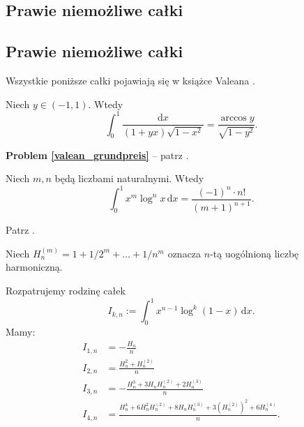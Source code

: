 \subsection{Prawie niemożliwe całki}
\subsection{Prawie niemożliwe całki}
Wszystkie poniższe całki pojawiają się w książce Valeana \cite{valean19}.

\begin{problem_with_solution}
    \label{valean_grundpreis}%
    Niech $y \in (-1, 1)$.
    Wtedy
    \begin{equation}
        \int_0^1 \frac{\mathrm{d}x}{(1+yx) \sqrt{1-x^2}} = \frac{\arccos y}{\sqrt{1-y^2}}.
    \end{equation}
\end{problem_with_solution}

\textbf{Problem \ref{valean_grundpreis}} -- 
patrz \cite[s. 1]{valean19}.

\begin{problem_with_solution}
    \label{valean_zeugenstand}%
    Niech $m, n$ będą liczbami naturalnymi.
    Wtedy
    \begin{equation}
        \int_0^1 x^m \log^n x \,\mathrm{d} x = \frac{(-1)^n \cdot n!}{(m+1)^{n+1}}.
    \end{equation}
\end{problem_with_solution}

\begin{solution}
    Patrz \cite[s. 1]{valean19}.
\end{solution}


Niech $H_{n}^{(m)} = 1 + 1/2^m + \ldots + 1/n^m$ oznacza $n$-tą uogólnioną liczbę harmoniczną.

\begin{problem_with_solution}
    \label{valean_1_3}%
    Rozpatrujemy rodzinę całek
    \begin{equation}
        I_{k,n} := \int_0^1 x^{n-1} \log^k (1-x) \,\mathrm{d} x.
    \end{equation}
    Mamy:
    \begin{align}
        I_{1,n} & = - \frac{H_n}{n} \\
        I_{2,n} & = \frac{H_n^2 + H_n^{(2)}}{n} \\
        I_{3,n} & = - \frac{H_n^3 + 3H_nH_n^{(2)} + 2H_n^{(3)}}{n} \\
        I_{4,n} & = \frac{H_n^4 + 6H_n^2 H_n^{(2)} + 8H_nH_n^{(3)} + 3(H_n^{(2)})^2 + 6H_n^{(4)}}{n}.
    \end{align}
\end{problem_with_solution}

